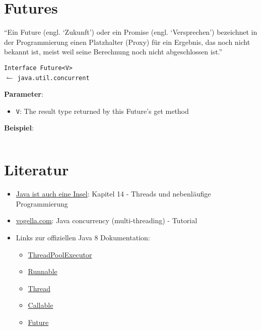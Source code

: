 \section{Futures}
\enquote{Ein Future (engl. \enquote{Zukunft}) oder ein Promise (engl. \enquote{Versprechen}) bezeichnet in der Programmierung einen Platzhalter (Proxy) für ein Ergebnis, das noch nicht bekannt ist, meist weil seine Berechnung noch nicht abgeschlossen ist.}

\texttt{Interface Future<V>}\\
\-\hspace{0.8cm}$\leftharpoonup$ \texttt{java.util.concurrent}

\textbf{Parameter}:
\begin{itemize}
    \item \texttt{V}: The result type returned by this Future's get method
\end{itemize}

\textbf{Beispiel}:
\begin{beispiel}
    \inputminted[numbersep=5pt, tabsize=4]{java}{scripts/java/vorlesung-futures-basics.java}
\end{beispiel}


\section{Literatur}
\begin{itemize}
    \item \href{http://openbook.galileocomputing.de/javainsel9/javainsel_14_004.htm}{Java ist auch eine Insel}: Kapitel 14 -
          Threads und nebenläufige Programmierung
    \item \href{http://www.vogella.com/tutorials/JavaConcurrency/article.html}{vogella.com}: Java concurrency (multi-threading) - Tutorial
    \item Links zur offiziellen Java 8 Dokumentation:
        \begin{itemize}
            \item \href{http://docs.oracle.com/javase/8/docs/api/java/util/concurrent/ThreadPoolExecutor.html}{ThreadPoolExecutor}
            \item \href{http://docs.oracle.com/javase/8/docs/api/java/lang/Runnable.html}{Runnable}
            \item \href{http://docs.oracle.com/javase/8/docs/api/java/lang/Thread.html}{Thread}
            \item \href{http://docs.oracle.com/javase/8/docs/api/java/util/concurrent/Callable.html}{Callable}
            \item \href{http://docs.oracle.com/javase/8/docs/api/java/util/concurrent/Future.html}{Future}
        \end{itemize}
\end{itemize}

